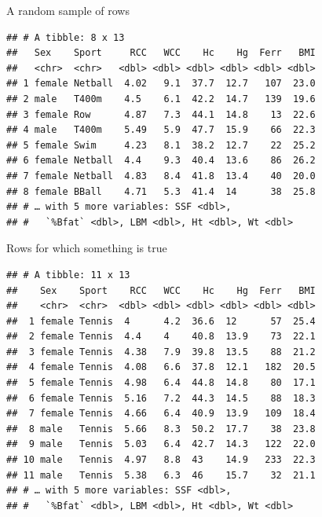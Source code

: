 \documentclass[
  ignorenonframetext,
]{beamer}
\newenvironment{Shaded}{\begin{snugshade}}{\end{snugshade}}
\newcommand{\DecValTok}[1]{\textcolor[rgb]{0.00,0.00,0.81}{#1}}
\newcommand{\KeywordTok}[1]{\textcolor[rgb]{0.13,0.29,0.53}{\textbf{#1}}}
\newcommand{\NormalTok}[1]{#1}
\newcommand{\OperatorTok}[1]{\textcolor[rgb]{0.81,0.36,0.00}{\textbf{#1}}}
\newcommand{\StringTok}[1]{\textcolor[rgb]{0.31,0.60,0.02}{#1}}
\begin{document}
\begin{frame}[fragile]{A random sample of rows}
\protect\hypertarget{a-random-sample-of-rows}{}

\begin{Shaded}
\end{Shaded}

\begin{verbatim}
## # A tibble: 8 x 13
##   Sex    Sport     RCC   WCC    Hc    Hg  Ferr   BMI
##   <chr>  <chr>   <dbl> <dbl> <dbl> <dbl> <dbl> <dbl>
## 1 female Netball  4.02   9.1  37.7  12.7   107  23.0
## 2 male   T400m    4.5    6.1  42.2  14.7   139  19.6
## 3 female Row      4.87   7.3  44.1  14.8    13  22.6
## 4 male   T400m    5.49   5.9  47.7  15.9    66  22.3
## 5 female Swim     4.23   8.1  38.2  12.7    22  25.2
## 6 female Netball  4.4    9.3  40.4  13.6    86  26.2
## 7 female Netball  4.83   8.4  41.8  13.4    40  20.0
## 8 female BBall    4.71   5.3  41.4  14      38  25.8
## # … with 5 more variables: SSF <dbl>,
## #   `%Bfat` <dbl>, LBM <dbl>, Ht <dbl>, Wt <dbl>
\end{verbatim}

\end{frame}

\begin{frame}[fragile]{Rows for which something is true}
\protect\hypertarget{rows-for-which-something-is-true}{}

\footnotesize

\begin{Shaded}
\end{Shaded}

\begin{verbatim}
## # A tibble: 11 x 13
##    Sex    Sport    RCC   WCC    Hc    Hg  Ferr   BMI
##    <chr>  <chr>  <dbl> <dbl> <dbl> <dbl> <dbl> <dbl>
##  1 female Tennis  4      4.2  36.6  12      57  25.4
##  2 female Tennis  4.4    4    40.8  13.9    73  22.1
##  3 female Tennis  4.38   7.9  39.8  13.5    88  21.2
##  4 female Tennis  4.08   6.6  37.8  12.1   182  20.5
##  5 female Tennis  4.98   6.4  44.8  14.8    80  17.1
##  6 female Tennis  5.16   7.2  44.3  14.5    88  18.3
##  7 female Tennis  4.66   6.4  40.9  13.9   109  18.4
##  8 male   Tennis  5.66   8.3  50.2  17.7    38  23.8
##  9 male   Tennis  5.03   6.4  42.7  14.3   122  22.0
## 10 male   Tennis  4.97   8.8  43    14.9   233  22.3
## 11 male   Tennis  5.38   6.3  46    15.7    32  21.1
## # … with 5 more variables: SSF <dbl>,
## #   `%Bfat` <dbl>, LBM <dbl>, Ht <dbl>, Wt <dbl>
\end{verbatim}

\normalsize

\end{frame}
\end{document}
